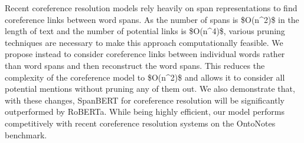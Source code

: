 Recent coreference resolution models rely heavily on span representations to find coreference links between word spans. As the number of spans is \$O(n^2)\$ in the length of text and the number of potential links is \$O(n^4)\$, various pruning techniques are necessary to make this approach computationally feasible. We propose instead to consider coreference links between individual words rather than word spans and then reconstruct the word spans. This reduces the complexity of the coreference model to \$O(n^2)\$ and allows it to consider all potential mentions without pruning any of them out. We also demonstrate that, with these changes, SpanBERT for coreference resolution will be significantly outperformed by RoBERTa. While being highly efficient, our model performs competitively with recent coreference resolution systems on the OntoNotes benchmark.
